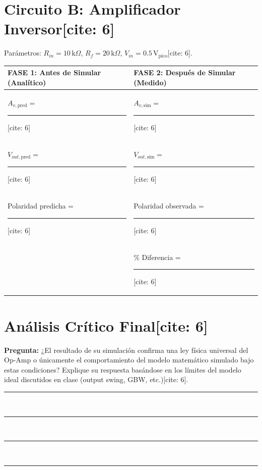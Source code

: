 \documentclass[11pt, a4paper]{article}
\begin{document}
\section*{Circuito B: Amplificador Inversor[cite: 6]}
Parámetros: $R_{in} = 10\,\text{k}\Omega$, $R_f = 20\,\text{k}\Omega$, $V_{in} = 0.5\,\text{V}_{\text{pico}}$[cite: 6].

\begin{table}[h]
    \centering
    \renewcommand{\arraystretch}{1.5}
    \begin{tabularx}{\textwidth}{@{} X X @{}}
    \toprule
    \rowcolor[HTML]{EFEFEF}
    \textbf{FASE 1: Antes de Simular (Analítico)} & \textbf{FASE 2: Después de Simular (Medido)} \\ \midrule
    $A_{v, \text{pred}} =$ \rule{3cm}{0.4pt}[cite: 6] & $A_{v, \text{sim}} =$ \rule{3cm}{0.4pt}[cite: 6] \\
    $V_{out, \text{pred}} =$ \rule{3cm}{0.4pt}[cite: 6] & $V_{out, \text{sim}} =$ \rule{3cm}{0.4pt}[cite: 6] \\
    Polaridad predicha = \rule{3cm}{0.4pt}[cite: 6] & Polaridad observada = \rule{2.5cm}{0.4pt}[cite: 6] \\
    & \% Diferencia = \rule{3cm}{0.4pt}[cite: 6] \\
    \bottomrule
    \end{tabularx}
\end{table}

\section*{Análisis Crítico Final[cite: 6]}
\textbf{Pregunta:} ¿El resultado de su simulación confirma una ley física universal del Op-Amp o únicamente el comportamiento del modelo matemático simulado bajo estas condiciones? Explique su respuesta basándose en los límites del modelo ideal discutidos en clase (output swing, GBW, etc.)[cite: 6]. \\
\rule{\textwidth}{0.4pt} \\
\rule{\textwidth}{0.4pt} \\
\rule{\textwidth}{0.4pt} \\
\rule{\textwidth}{0.4pt}
\end{document}
